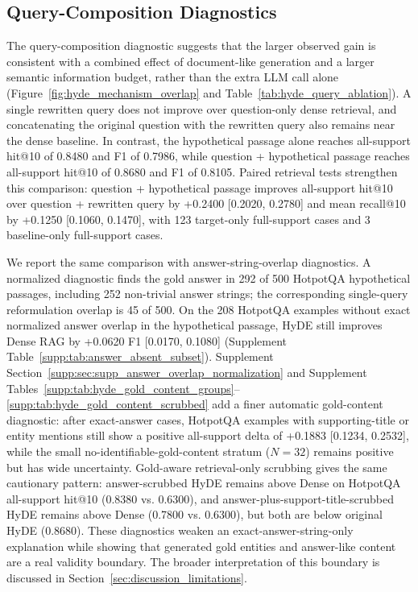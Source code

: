 \subsection{Query-Composition Diagnostics}
\label{sec:query_composition_diagnostic}

The query-composition diagnostic suggests that the larger observed gain is consistent with a combined effect of document-like generation and a larger semantic information budget, rather than the extra LLM call alone (Figure~\ref{fig:hyde_mechanism_overlap} and Table~\ref{tab:hyde_query_ablation}). A single rewritten query does not improve over question-only dense retrieval, and concatenating the original question with the rewritten query also remains near the dense baseline. In contrast, the hypothetical passage alone reaches all-support hit@10 of 0.8480 and F1 of 0.7986, while question + hypothetical passage reaches all-support hit@10 of 0.8680 and F1 of 0.8105. Paired retrieval tests strengthen this comparison: question + hypothetical passage improves all-support hit@10 over question + rewritten query by +0.2400 [0.2020, 0.2780] and mean recall@10 by +0.1250 [0.1060, 0.1470], with 123 target-only full-support cases and 3 baseline-only full-support cases.

We report the same comparison with answer-string-overlap diagnostics. A normalized diagnostic finds the gold answer in 292 of 500 HotpotQA hypothetical passages, including 252 non-trivial answer strings; the corresponding single-query reformulation overlap is 45 of 500. On the 208 HotpotQA examples without exact normalized answer overlap in the hypothetical passage, HyDE still improves Dense RAG by +0.0620 F1 [0.0170, 0.1080] (Supplement Table~\ref{supp:tab:answer_absent_subset}). Supplement Section~\ref{supp:sec:supp_answer_overlap_normalization} and Supplement Tables~\ref{supp:tab:hyde_gold_content_groups}--\ref{supp:tab:hyde_gold_content_scrubbed} add a finer automatic gold-content diagnostic: after exact-answer cases, HotpotQA examples with supporting-title or entity mentions still show a positive all-support delta of +0.1883 [0.1234, 0.2532], while the small no-identifiable-gold-content stratum ($N=32$) remains positive but has wide uncertainty. Gold-aware retrieval-only scrubbing gives the same cautionary pattern: answer-scrubbed HyDE remains above Dense on HotpotQA all-support hit@10 (0.8380 vs. 0.6300), and answer-plus-support-title-scrubbed HyDE remains above Dense (0.7800 vs. 0.6300), but both are below original HyDE (0.8680). These diagnostics weaken an exact-answer-string-only explanation while showing that generated gold entities and answer-like content are a real validity boundary. The broader interpretation of this boundary is discussed in Section~\ref{sec:discussion_limitations}.

